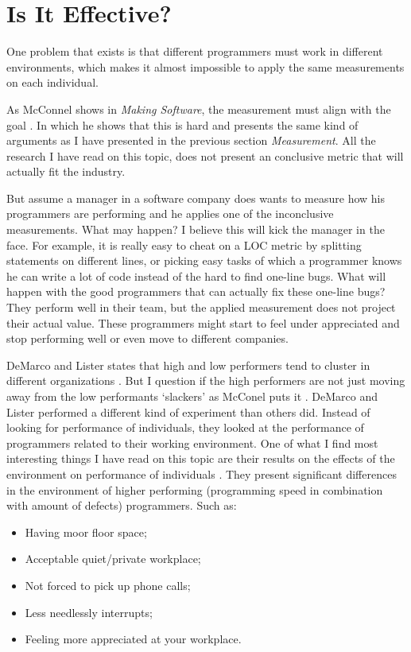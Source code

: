 \section*{Is It Effective?}

One problem that exists is that different programmers must work in different environments,
which makes it almost impossible to apply the same measurements on each individual.

As McConnel shows in \textit{Making Software}, the measurement must align with the goal \autocite[570-571]{MAKING_SOFTWARE}.
In which he shows that this is hard and presents the same kind of arguments as I have presented in the previous section \textit{Measurement}.
All the research I have read on this topic, does not present an conclusive metric that will actually fit the industry.

But assume a manager in a software company does wants to measure how his programmers are performing and he applies one of the inconclusive measurements.
What may happen? I believe this will kick the manager in the face.
For example, it is really easy to cheat on a LOC metric by splitting statements on different lines, or picking easy tasks of which a programmer knows he can write a lot of code instead of the hard to find one-line bugs.
What will happen with the good programmers that can actually fix these one-line bugs?
They perform well in their team, but the applied measurement does not project their actual value.
These programmers might start to feel under appreciated and stop performing well or even move to different companies.

DeMarco and Lister states that high and low performers tend to cluster in different organizations \autocite[268]{demarco1985programmer}.
But I question if the high performers are not just moving away from the low performants `slackers' as McConel puts it \autocite[569]{MAKING_SOFTWARE}.
DeMarco and Lister performed a different kind of experiment than others did.
Instead of looking for performance of individuals, they looked at the performance of programmers related to their working environment.
One of what I find most interesting things I have read on this topic are their results on the effects of the environment on performance of individuals \autocite[271]{demarco1985programmer}.
They present significant differences in the environment of higher performing (programming speed in combination with amount of defects) programmers. Such as:
\begin{itemize}[noitemsep]
\item Having moor floor space;
\item Acceptable quiet/private workplace;
\item Not forced to pick up phone calls;
\item Less needlessly interrupts;
\item Feeling more appreciated at your workplace.
\end{itemize}


